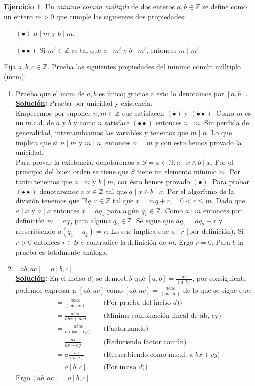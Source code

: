 \documentclass[11pt,letterpaper]{article}
\theoremstyle{definition}\newtheorem{p}{Ejercicio}
\theoremstyle{definition}\newtheorem{pp}[p]{$(*)$Ejercicio}
\numberwithin{p}{section}
\newcommand{\Z}{\mathbb{Z}}
\newcommand{\N}{\mathbb{N}}
\newcommand{\sol}{\textbf{\underline{Solución}: }} %
\begin{document}
\begin{p}
  Un \emph{m\'inimo com\'un m\'ultiplo} de dos enteros $a,b\in\Z$ se define como un entero $m> 0$
  que cumple las siguientes dos propiedades:
  \begin{enumerate}
  \item[$(\bullet)$] $a\mid m$ y $b\mid m$.
  \item[$(\bullet\bullet)$] Si $m'\in\Z$ es tal que $a\mid m'$ y $b\mid m'$, entonces $m\mid m'$.
  \end{enumerate}
  Fija $a,b,c\in\Z$. Prueba las siguientes propiedades del m\'inimo com\'un m\'ultiplo (mcm):
  \begin{enumerate}
  \item Prueba que el mcm de $a,b$ es \'unico; gracias a esto lo denotamos por $[a,b]$.\\
  \sol Prueba por unicidad y existencia.\\
  Empecemos por suponer $n,m \in \Z$ que satisfacen $(\bullet)$ y 
  $(\bullet \bullet)$. Como $m$ es un m.c.d. de $a$ y $b$ y como $n$ satisface $(\bullet \bullet)$ 
  entonces $n \mid m$. Sin perdida de generalidad, intercambiamos las variables y tenemos que
  $m \mid n$. Lo que implica que si $n \mid m$ y $m \mid n$, entonces $n=m$ y con esto 
  hemos provado la unicidad.\\
  Para provar la existencia, denotaremos a $S = {x \in \N : a \mid x \land b \mid x}$. Por el 
  principio del buen orden se tiene que $S$ tiene un elemento mínimo $m$. Por tanto tenemos que 
  $a \mid m$ y $b \mid m$, con ésto hemos provado $(\bullet)$. Para probar $(\bullet \bullet)$ 
  denotaremos a $x \in \Z$ tal que $a \mid x \land b \mid x$. Por el algorítmo de la división 
  tenemos que $\exists! q, r \in \Z$ tal que $x = mq+r, \quad 0 < r \leq m$. Dado que $a \mid x$
  y $a \mid x$ entonces $x = aq_1$ para algún $q_1 \in \Z$. Como $a \mid m$ entonces por definición 
  $m = aq_2$ para alguna $q_2 \in \Z$. Se sigue que $aq_1 = aq_2+r$ y reescribiendo $a(q_1 - q_2)= r$. 
  Lo que implica que $a \mid r$ (por definición). Si $r>0$ entonces $r \in S$ y contradice la 
  definición de $m$. Ergo $r = 0$. Para $b$ la prueba es totalmente análoga.
  
  \item $[ab,ac]=a[b,c]$\\
  \sol En el inciso $d)$ se demostró qué $[a,b]=\frac{ab}{(a,b)}$, por consiguiente podemos expresar a
  $[ab,ac]$ como $[ab,ac]=\frac{abac}{(ab,ac)}$ de lo que se sigue que:
  \begin{align*}
  [ab,ac]
      &= \frac{abac}{(ab,ac)} && \text{(Por prueba del inciso $d)$)}\\
      &= \frac{abac}{abx+acy} && \text{(Mínima combinación lineal de ab, cy)}\\
      &= \frac{abac}{a(bx + cy)} && \text{(Factorizando)}\\
      &= \frac{abc}{bx+cy} && \text{(Reduciendo factor común)}\\
      &= a \frac{bc}{(b,c)} && \text{(Reescribiendo como m.c.d. a $bx+cy$)}\\
      &= a [b, c] && \text{(Por inciso $d)$)}
  \end{align*}
  Ergo $[ab,ac]=a[b,c]$.
  

\end{enumerate}
\end{p}
\end{document}
